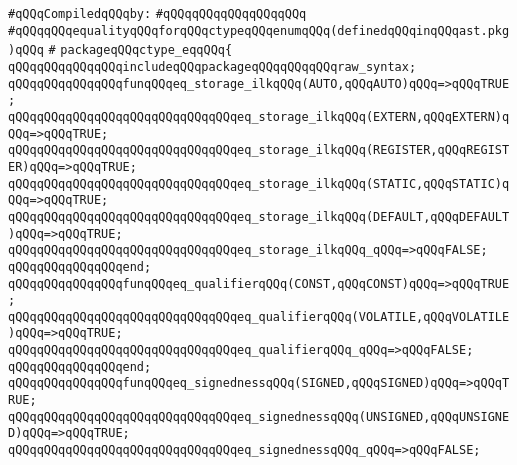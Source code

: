 \label{src/lib/c-kit/src/ast/ctype-eq.pkg}
\newline
\verb|#qQQqCompiledqQQqby:|\newline
\verb|#qQQqqQQqqQQqqQQqqQQq|\newline
\newline
\verb|#qQQqqQQqequalityqQQqforqQQqctypeqQQqenumqQQq(definedqQQqinqQQqast.pkg)qQQq|\newline
\verb|#|\newline
\verb|packageqQQqctype_eqqQQq{|\newline
\newline
\verb|qQQqqQQqqQQqqQQqincludeqQQqpackageqQQqqQQqqQQqraw_syntax;|\newline
\newline
\verb|qQQqqQQqqQQqqQQqfunqQQqeq_storage_ilkqQQq(AUTO,qQQqAUTO)qQQq=>qQQqTRUE;|\newline
\verb|qQQqqQQqqQQqqQQqqQQqqQQqqQQqqQQqeq_storage_ilkqQQq(EXTERN,qQQqEXTERN)qQQq=>qQQqTRUE;|\newline
\verb|qQQqqQQqqQQqqQQqqQQqqQQqqQQqqQQqeq_storage_ilkqQQq(REGISTER,qQQqREGISTER)qQQq=>qQQqTRUE;|\newline
\verb|qQQqqQQqqQQqqQQqqQQqqQQqqQQqqQQqeq_storage_ilkqQQq(STATIC,qQQqSTATIC)qQQq=>qQQqTRUE;|\newline
\verb|qQQqqQQqqQQqqQQqqQQqqQQqqQQqqQQqeq_storage_ilkqQQq(DEFAULT,qQQqDEFAULT)qQQq=>qQQqTRUE;|\newline
\verb|qQQqqQQqqQQqqQQqqQQqqQQqqQQqqQQqeq_storage_ilkqQQq_qQQq=>qQQqFALSE;|\newline
\verb|qQQqqQQqqQQqqQQqend;|\newline
\newline
\verb|qQQqqQQqqQQqqQQqfunqQQqeq_qualifierqQQq(CONST,qQQqCONST)qQQq=>qQQqTRUE;|\newline
\verb|qQQqqQQqqQQqqQQqqQQqqQQqqQQqqQQqeq_qualifierqQQq(VOLATILE,qQQqVOLATILE)qQQq=>qQQqTRUE;|\newline
\verb|qQQqqQQqqQQqqQQqqQQqqQQqqQQqqQQqeq_qualifierqQQq_qQQq=>qQQqFALSE;|\newline
\verb|qQQqqQQqqQQqqQQqend;|\newline
\newline
\verb|qQQqqQQqqQQqqQQqfunqQQqeq_signednessqQQq(SIGNED,qQQqSIGNED)qQQq=>qQQqTRUE;|\newline
\verb|qQQqqQQqqQQqqQQqqQQqqQQqqQQqqQQqeq_signednessqQQq(UNSIGNED,qQQqUNSIGNED)qQQq=>qQQqTRUE;|\newline
\verb|qQQqqQQqqQQqqQQqqQQqqQQqqQQqqQQqeq_signednessqQQq_qQQq=>qQQqFALSE;|\newline
